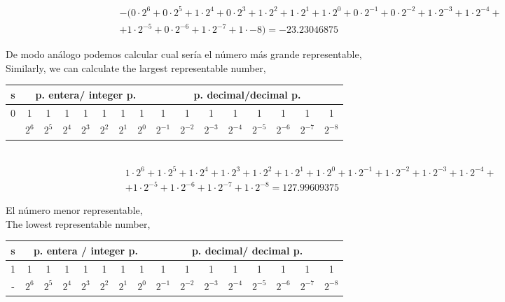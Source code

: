 \begin{equation*}
\begin{split}
&-(0\cdot 2^6+0 \cdot 2^5+ 1\cdot 2^4+ 0 \cdot 2^3+ 1 \cdot 2^2 + 1 \cdot 2^1 + 1 \cdot 2^0 + 0 \cdot 2^{-1}+ 0 \cdot 2^{-2}+ 1 \cdot 2^{-3}+ 1 \cdot 2^{-4}+ \\
& +1 \cdot 2^{-5}+0 \cdot 2^{-6} +1 \cdot 2^{-7}+1 \cdot {-8}) = - 23.23046875
\end{split}
\end{equation*}

\begin{paracol}{2}
De modo análogo podemos calcular cual sería el número más grande representable,\\
\switchcolumn
Similarly, we can calculate the largest representable number, 
\end{paracol}

\begin{tabular}{|c||c|c|c|c|c|c|c||c|c|c|c|c|c|c|c|}
\hline
s&\multicolumn{7}{c||}{p. entera/ integer p.}&\multicolumn{8}{c|}{p. decimal/decimal p.}\\
\hline
0&1&1&1&1&1&1&1&1&1&1&1&1&1&1&1\\
\hline
&$2^{6}$&$2^{5}$&$2^{4}$&$2^{3}$&$2^{2}$&$2^{1}$&$2^{0}$&$2^{-1}$&$2^{-2}$&$2^{-3}$&$2^{-4}$&$2^{-5}$&$2^{-6}$&$2^{-7}$&$2^{-8}$\\
\hline
\end{tabular}\\

\begin{equation*}
\begin{split}
&1\cdot 2^6+1 \cdot 2^5+ 1\cdot 2^4+ 1 \cdot 2^3+ 1 \cdot 2^2 + 1 \cdot 2^1 + 1 \cdot 2^0 + 1 \cdot 2^{-1}+ 1 \cdot 2^{-2}+ 1 \cdot 2^{-3}+ 1 \cdot 2^{-4}+ \\
&+1 \cdot 2^{-5}+1 \cdot 2^{-6} +1 \cdot 2^{-7}+ 1\cdot 2^{-8} =  127.99609375
\end{split}
\end{equation*}

\begin{paracol}{2}
El número menor representable,\\
\switchcolumn
The lowest representable number,
\end{paracol}

\begin{tabular}{|c||c|c|c|c|c|c|c||c|c|c|c|c|c|c|c|}
\hline
s&\multicolumn{7}{c||}{p. entera / integer p.}&\multicolumn{8}{c|}{p. decimal/ decimal p.}\\
\hline
1&1&1&1&1&1&1&1&1&1&1&1&1&1&1&1\\
\hline
-&$2^{6}$&$2^{5}$&$2^{4}$&$2^{3}$&$2^{2}$&$2^{1}$&$2^{0}$&$2^{-1}$&$2^{-2}$&$2^{-3}$&$2^{-4}$&$2^{-5}$&$2^{-6}$&$2^{-7}$&$2^{-8}$\\
\hline
\end{tabular}\\

